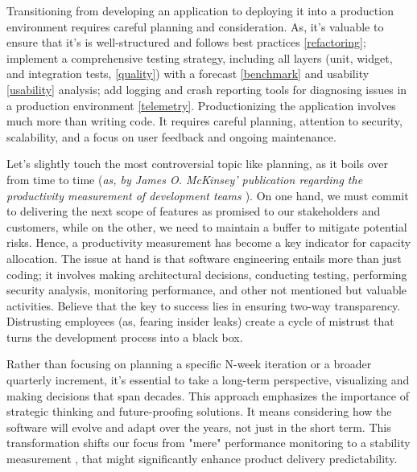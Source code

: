 

Transitioning from developing an application to deploying it into a production environment requires careful planning 
and consideration. As, it's valuable to ensure that it's is well-structured and follows best practices 
\ref{refactoring}; implement a comprehensive testing strategy, including all layers (unit, widget, and integration 
tests, \ref{quality}) with a forecast \ref{benchmark} and usability \ref{usability} analysis; add logging and crash 
reporting tools for diagnosing issues in a production environment \ref{telemetry}. Productionizing the application 
involves much more than writing code. It requires careful planning, attention to security, scalability, and a focus 
on user feedback and ongoing maintenance. 

Let's slightly touch the most controversial topic like planning, as it boils over from time to time (\emph{as, by James 
O. McKinsey' publication regarding the productivity measurement of development teams \cite{McKi23}}). On one hand, we 
must commit to delivering the next scope of features as promised to our stakeholders and customers, while on the other, 
we need to maintain a buffer to mitigate potential risks. Hence, a productivity measurement has become a key indicator 
for capacity allocation. The issue at hand is that software engineering entails more than just coding; it involves 
making architectural decisions, conducting testing, performing security analysis, monitoring performance, and other 
not mentioned but valuable activities. Believe that the key to success lies in ensuring two-way transparency. 
Distrusting employees (as, fearing insider leaks) create a cycle of mistrust that turns the development process into a 
black box. 

Rather than focusing on planning a specific N-week iteration or a broader quarterly increment, it's essential to take a 
long-term perspective, visualizing and making decisions that span decades. This approach emphasizes the importance of 
strategic thinking and future-proofing solutions. It means considering how the software will evolve and adapt over the 
years, not just in the short term. This transformation shifts our focus from "mere" performance monitoring to a 
stability measurement \cite{Heal23}, that might significantly enhance product delivery predictability.

